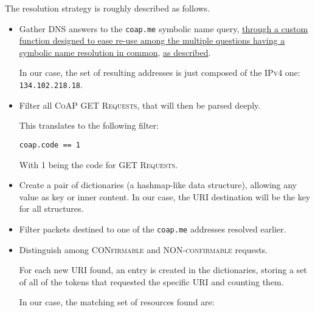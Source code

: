 \documentclass[a4paper,11pt]{article} %
\begin{document}
    \medskip

    The resolution strategy is roughly described as follows.

    \begin{itemize}
        \item Gather DNS answers to the \texttt{coap.me} symbolic name query, \hyperref[subsubsec:dns-resolution-python]{through a custom function designed to ease re-use among the multiple questions having a symbolic name resolution in common}, \hyperref[sec:question-n.-2]{as described}.

        In our case, the set of resulting addresses is just composed of the \textsc{IPv4} one: \texttt{134.102.218.18}.
        \item Filter all \textsc{CoAP GET Requests}, that will then be parsed deeply.

        This translates to the following filter:

        \texttt{coap.code == 1}

        With 1 being the code for \textsc{GET Requests}.

        \item Create a pair of dictionaries (a hashmap-like data structure), allowing any value as key or inner content.
        In our case, the \textsc{URI} destination will be the key for all structures.
        \item Filter packets destined to one of the \texttt{coap.me} addresses resolved earlier.
        \item Distinguish among \textsc{CONfirmable} and \textsc{NON-confirmable} requests.

        For each new \textsc{URI} found, an entry is created in the dictionaries, storing a set of all of the tokens that requested the specific \textsc{URI} and counting them.

        In our case, the matching set of resources found are:


\end{itemize}
\end{document}
